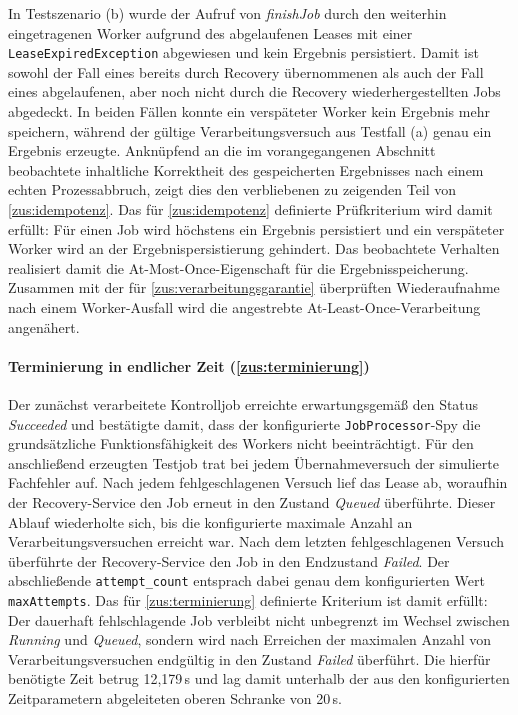 In Testszenario (b) wurde der Aufruf von \textit{finishJob} durch den weiterhin eingetragenen Worker aufgrund des abgelaufenen
Leases mit einer \texttt{LeaseExpiredException} abgewiesen und kein Ergebnis persistiert.
Damit ist sowohl der Fall eines bereits durch Recovery übernommenen als auch der Fall eines abgelaufenen, aber noch nicht
durch die Recovery wiederhergestellten Jobs abgedeckt.
In beiden Fällen konnte ein verspäteter Worker kein Ergebnis mehr speichern, während der gültige Verarbeitungsversuch aus
Testfall (a) genau ein Ergebnis erzeugte.
Anknüpfend an die im vorangegangenen Abschnitt beobachtete inhaltliche Korrektheit des gespeicherten Ergebnisses nach
einem echten Prozessabbruch, zeigt dies den verbliebenen zu zeigenden Teil von \ref{zus:idempotenz}.
Das für \ref{zus:idempotenz} definierte Prüfkriterium wird damit erfüllt: Für einen Job wird höchstens ein Ergebnis
persistiert und ein verspäteter Worker wird an der Ergebnispersistierung gehindert.
Das beobachtete Verhalten realisiert damit die At-Most-Once-Eigenschaft für die Ergebnisspeicherung.
Zusammen mit der für \ref{zus:verarbeitungsgarantie} überprüften Wiederaufnahme nach einem Worker-Ausfall wird die
angestrebte At-Least-Once-Verarbeitung angenähert.

\paragraph{Terminierung in endlicher Zeit (\ref{zus:terminierung})}
\label{erg:terminierung}
Der zunächst verarbeitete Kontrolljob erreichte erwartungsgemäß den Status \textit{Succeeded} und bestätigte damit,
dass der konfigurierte \texttt{JobProcessor}-Spy die grundsätzliche Funktionsfähigkeit des Workers nicht beeinträchtigt.
Für den anschließend erzeugten Testjob trat bei jedem Übernahmeversuch der simulierte Fachfehler auf.
Nach jedem fehlgeschlagenen Versuch lief das Lease ab, woraufhin der Recovery-Service den Job erneut in den Zustand \textit{Queued} überführte.
Dieser Ablauf wiederholte sich, bis die konfigurierte maximale Anzahl an Verarbeitungsversuchen erreicht war.
Nach dem letzten fehlgeschlagenen Versuch überführte der Recovery-Service den Job in den Endzustand \textit{Failed}.
Der abschließende \texttt{attempt\_count} entsprach dabei genau dem konfigurierten Wert \texttt{maxAttempts}.
Das für \ref{zus:terminierung} definierte Kriterium ist damit erfüllt: Der dauerhaft fehlschlagende Job verbleibt
nicht unbegrenzt im Wechsel zwischen \textit{Running} und \textit{Queued}, sondern wird nach Erreichen der
maximalen Anzahl von Verarbeitungsversuchen endgültig in den Zustand \textit{Failed} überführt.
Die hierfür benötigte Zeit betrug 12,179\,s und lag damit unterhalb der aus den konfigurierten Zeitparametern
abgeleiteten oberen Schranke von 20\,s.

